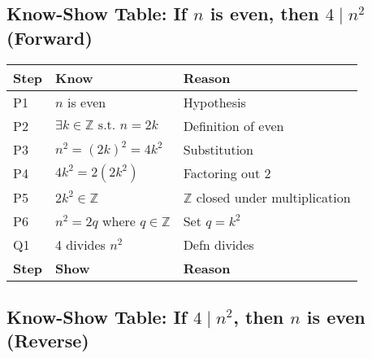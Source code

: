 \documentclass[12pt]{article}
\theoremstyle{definition}
\begin{document}

\newpage

\subsection[]{Know-Show Table: If \( n \) is even, then \( 4 \mid n^2 \) (Forward)}

\begin{center}
    \begin{tabular}{|p{}|p{}|p{}|}
    \hline
    \textbf{Step} & \textbf{Know} & \textbf{Reason} \\
    \hline
        P1 & \( n \) is even & Hypothesis \\
    \hline
        P2 & \( \exists k \in \mathbb{Z} \text{ s.t. } n = 2k \) & Definition of even \\
    \hline
        P3 & \( n^2 = (2k)^2 = 4k^2 \) & Substitution \\
    \hline
        P4 & \( 4k^2 = 2(2k^2) \) & Factoring out \( 2 \) \\
    \hline
        P5 & \( 2k^2 \in \mathbb{Z} \) & \( \mathbb{Z}\) closed under multiplication \\
    \hline
        P6 & \( n^2 = 2q \) where \( q \in \mathbb{Z} \) & Set \( q = k^2 \) \\
    \hline
        Q1 & 4 divides \( n^2 \) & Defn divides \\
    \hline
    \textbf{Step} & \textbf{Show} & \textbf{Reason} \\
    \hline
    \end{tabular}
\end{center}


\subsection[]{Know-Show Table: If \( 4 \mid n^2 \), then \( n \) is even (Reverse)}
\end{document}
